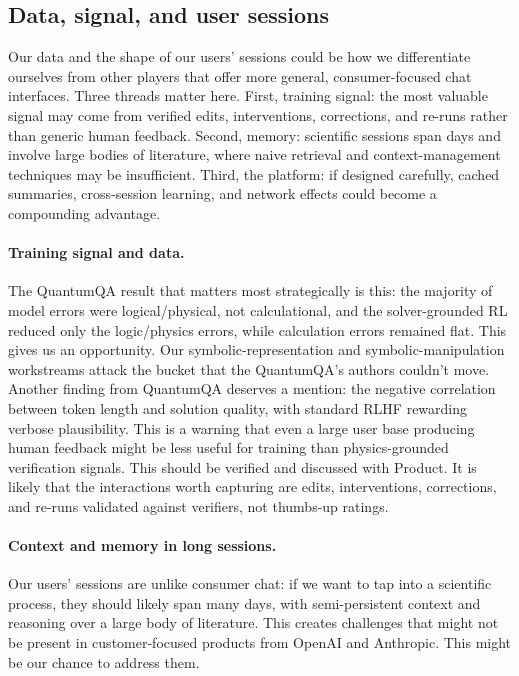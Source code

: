 \subsection{Data, signal, and user sessions}
\label{section:data_signal_sessions}

\begin{summarybox}
Our data and the shape of our users' sessions could be how we differentiate ourselves from other players that offer more general, consumer-focused chat interfaces. Three threads matter here. First, training signal: the most valuable signal may come from verified edits, interventions, corrections, and re-runs rather than generic human feedback. Second, memory: scientific sessions span days and involve large bodies of literature, where naive retrieval and context-management techniques may be insufficient. Third, the platform: if designed carefully, cached summaries, cross-session learning, and network effects could become a compounding advantage.
\end{summarybox}


\paragraph{Training signal and data.}
The QuantumQA \cite{2604.18176} result that matters most strategically is this: the majority of model errors were logical/physical, not calculational, and the solver-grounded RL reduced only the logic/physics errors, while calculation errors remained flat. 
This gives us an opportunity.
Our symbolic-representation and symbolic-manipulation workstreams attack the bucket that the QuantumQA's authors couldn't move.
Another finding from QuantumQA deserves a mention: the negative correlation between token length and solution quality, with standard RLHF rewarding verbose plausibility. This is a warning that even a large user base producing human feedback might be less useful for training than physics-grounded verification signals. This should be verified and discussed with Product. It is likely that the interactions worth capturing are edits, interventions, corrections, and re-runs validated against verifiers, not thumbs-up ratings.

\paragraph{Context and memory in long sessions.}
Our users' sessions are unlike consumer chat: if we want to tap into a scientific process, they should likely span many days, with semi-persistent context and reasoning over a large body of literature. This creates challenges that might not be present in customer-focused products from OpenAI and Anthropic. This might be our chance to address them.

